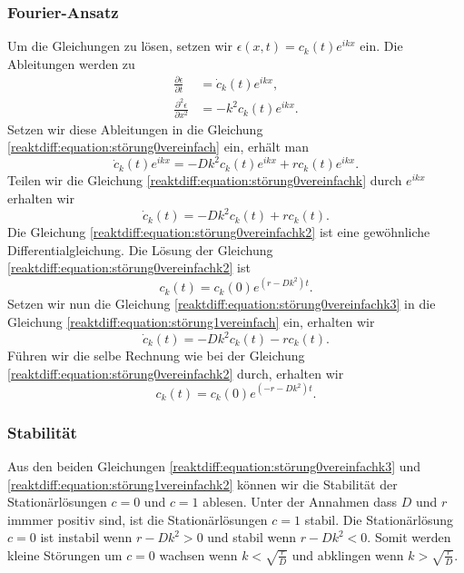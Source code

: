 \subsubsection{Fourier-Ansatz}
Um die Gleichungen zu lösen, setzen wir \(\epsilon(x,t) = c_k(t) e^{ikx}\) ein.
Die Ableitungen werden zu
\begin{align*}
\frac{\partial \epsilon}{\partial t} &= \dot{c}_k(t) e^{ikx},\\
\frac{\partial^2 \epsilon}{\partial x^2} &= -k^2 c_k(t) e^{ikx}.
\end{align*}
Setzen wir diese Ableitungen in die Gleichung \ref{reaktdiff:equation:störung0vereinfach} ein, erhält man
\begin{equation}
\label{reaktdiff:equation:störung0vereinfachk}
\dot{c}_k(t) e^{ikx} = -D k^2 c_k(t) e^{ikx} + r c_k(t) e^{ikx}.
\end{equation}
Teilen wir die Gleichung \ref{reaktdiff:equation:störung0vereinfachk} durch \(e^{ikx}\) erhalten wir
\begin{equation}
\label{reaktdiff:equation:störung0vereinfachk2}
\dot{c}_k(t) = -D k^2 c_k(t) + r c_k(t).
\end{equation}
Die Gleichung \ref{reaktdiff:equation:störung0vereinfachk2} ist eine gewöhnliche Differentialgleichung.
Die Lösung der Gleichung \ref{reaktdiff:equation:störung0vereinfachk2} ist
\begin{equation}
\label{reaktdiff:equation:störung0vereinfachk3}
c_k(t) = c_k(0) e^{(r - D k^2)t}.
\end{equation}
Setzen wir nun die Gleichung \ref{reaktdiff:equation:störung0vereinfachk3} in die Gleichung \ref{reaktdiff:equation:störung1vereinfach} ein, erhalten wir
\begin{equation}
\label{reaktdiff:equation:störung1vereinfachk}
\dot{c}_k(t) = -D k^2 c_k(t) - r c_k(t).
\end{equation}
Führen wir die selbe Rechnung wie bei der Gleichung \ref{reaktdiff:equation:störung0vereinfachk2} durch, erhalten wir
\begin{equation}
\label{reaktdiff:equation:störung1vereinfachk2}
c_k(t) = c_k(0) e^{(-r - D k^2)t}.
\end{equation}

\subsubsection{Stabilität}
Aus den beiden Gleichungen \eqref{reaktdiff:equation:störung0vereinfachk3} und \eqref{reaktdiff:equation:störung1vereinfachk2} können wir die Stabilität der Stationärlösungen \(c = 0\) und \(c = 1\) ablesen.
Unter der Annahmen dass \(D\) und \(r\) immmer positiv sind, ist die Stationärlösungen \(c = 1\) stabil.
Die Stationärlösung \(c = 0\) ist instabil wenn \(r-Dk^2 > 0\) und stabil wenn \(r-Dk^2 < 0\).
Somit werden kleine Störungen um \(c = 0\) wachsen wenn \(k < \sqrt{\frac{r}{D}}\) und abklingen wenn \(k > \sqrt{\frac{r}{D}}\).

